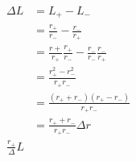 \begin{eqnarray}\label{eqn:net-likelihood}
\Delta L & = L_+ - L_- \\
& = \frac{r_+}{r_-} - \frac{r_-}{r_+} \\
& =  \frac{r+}{r_+}\frac{r_+}{r_-} - \frac{r_-}{r_-}\frac{r_-}{r_+} \\
& =  \frac{r_+^2 - r_-^2}{r_+r_-} \\
& =  \frac{(r_+ + r_-)(r_+ - r_-)}{r_+r_-} \\
& =  \frac{r_+ + r_-}{r_+r_-}\Delta r \\
\frac{r_+}\Delta L
\end{eqnarray}